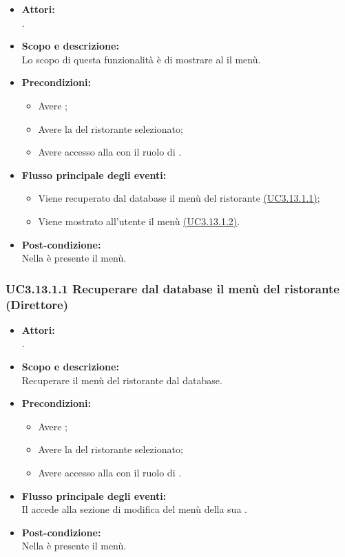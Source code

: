 \begin{itemize}
	\item \textbf{Attori:}
	\\.
	\item \textbf{Scopo e descrizione:} 
	\\Lo scopo di questa funzionalità è di mostrare al  il menù.
	\item \textbf{Precondizioni:}
	\begin{itemize}
		\item Avere ;
		\item Avere la  del ristorante selezionato;
		\item Avere accesso alla  con il ruolo di .
	\end{itemize}
	\item \textbf{Flusso principale degli eventi:}
	\begin{itemize}
		\item Viene recuperato dal database il menù del ristorante \hyperref[UC3.13.1.1]{(UC3.13.1.1)};
		\item Viene mostrato all'utente il menù \hyperref[UC3.13.1.2]{(UC3.13.1.2)}.
	\end{itemize}
	\item \textbf{Post-condizione:}
	\\Nella {} è presente il menù.
\end{itemize}

\subsubsection{UC3.13.1.1 Recuperare dal database il menù del ristorante (Direttore)} \label{UC3.13.1.1}

\begin{itemize}
	\item \textbf{Attori:}
	\\.
	\item \textbf{Scopo e descrizione:} 
	\\Recuperare il menù del ristorante dal database.
	\item \textbf{Precondizioni:}
	\begin{itemize}
		\item Avere ;
		\item Avere la  del ristorante selezionato;
		\item Avere accesso alla  con il ruolo di .
	\end{itemize}
	\item \textbf{Flusso principale degli eventi:}
	\\Il {} accede alla sezione di modifica del menù della sua .
	\item \textbf{Post-condizione:}
	\\Nella {} è presente il menù.
\end{itemize}

